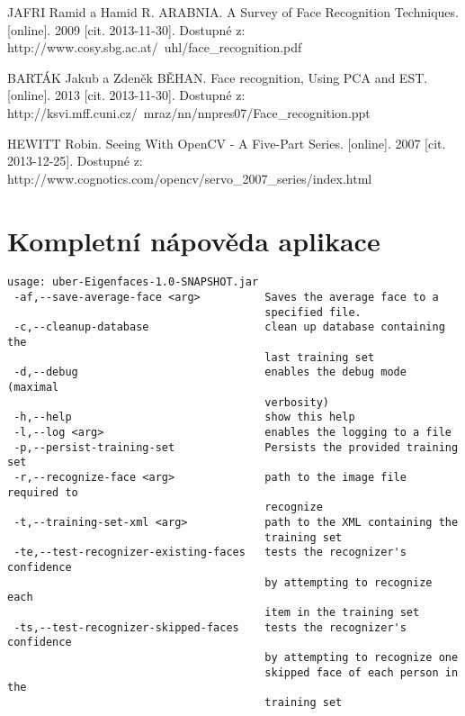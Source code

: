 \documentclass[10pt,a4paper]{article}
\begin{document}
\begin{thebibliography}{9}

	 JAFRI Ramid a Hamid R. ARABNIA. A Survey of Face Recognition Techniques. [online]. 2009 [cit. 2013-11-30]. Dostupné z: http://www.cosy.sbg.ac.at/~uhl/face\_recognition.pdf
	
	 BARTÁK Jakub a Zdeněk BĚHAN. Face recognition, Using PCA and EST. [online]. 2013 [cit. 2013-11-30]. Dostupné z: http://ksvi.mff.cuni.cz/~mraz/nn/nnpres07/Face\_recognition.ppt
	
	 HEWITT Robin. Seeing With OpenCV - A Five-Part Series. [online]. 2007 [cit. 2013-12-25]. Dostupné z: http://www.cognotics.com/opencv/servo\_2007\_series/index.html
	
\end{thebibliography}

\appendix 
\section{Kompletní nápověda aplikace}
\label{help}

\begin{verbatim}
usage: uber-Eigenfaces-1.0-SNAPSHOT.jar
 -af,--save-average-face <arg>          Saves the average face to a
                                        specified file.
 -c,--cleanup-database                  clean up database containing the
                                        last training set
 -d,--debug                             enables the debug mode (maximal
                                        verbosity)
 -h,--help                              show this help
 -l,--log <arg>                         enables the logging to a file
 -p,--persist-training-set              Persists the provided training set
 -r,--recognize-face <arg>              path to the image file required to
                                        recognize
 -t,--training-set-xml <arg>            path to the XML containing the
                                        training set
 -te,--test-recognizer-existing-faces   tests the recognizer's confidence
                                        by attempting to recognize each
                                        item in the training set
 -ts,--test-recognizer-skipped-faces    tests the recognizer's confidence
                                        by attempting to recognize one
                                        skipped face of each person in the
                                        training set

\end{verbatim}
\end{document}
